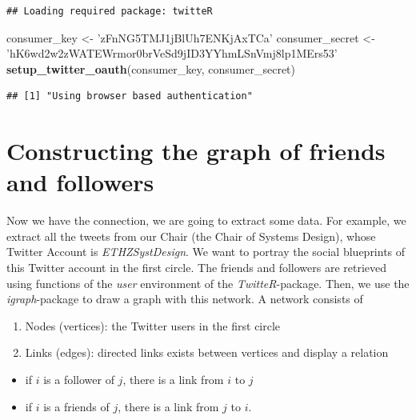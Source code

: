 \documentclass[]{article}
\newenvironment{Shaded}{\begin{snugshade}}{\end{snugshade}}
\newcommand{\KeywordTok}[1]{\textcolor[rgb]{0.13,0.29,0.53}{\textbf{{#1}}}}
\newcommand{\StringTok}[1]{\textcolor[rgb]{0.31,0.60,0.02}{{#1}}}
\newcommand{\NormalTok}[1]{{#1}}
\begin{document}
\begin{verbatim}
## Loading required package: twitteR
\end{verbatim}

\begin{Shaded}
\begin{Highlighting}[]
\NormalTok{consumer_key <-}\StringTok{ 'zFnNG5TMJ1jBlUh7ENKjAxTCa'}
\NormalTok{consumer_secret <-}\StringTok{ 'hK6wd2w2zWATEWrmor0brVeSd9jID3YYhmLSnVmj8lp1MErs53'}
\KeywordTok{setup_twitter_oauth}\NormalTok{(consumer_key, consumer_secret)}
\end{Highlighting}
\end{Shaded}

\begin{verbatim}
## [1] "Using browser based authentication"
\end{verbatim}

\section{Constructing the graph of friends and
followers}\label{constructing-the-graph-of-friends-and-followers}

Now we have the connection, we are going to extract some data. For
example, we extract all the tweets from our Chair (the Chair of Systems
Design), whose Twitter Account is \emph{ETHZSystDesign}. We want to
portray the social blueprints of this Twitter account in the first
circle. The friends and followers are retrieved using functions of the
\emph{user} environment of the \emph{TwitteR}-package. Then, we use the
\emph{igraph}-package to draw a graph with this network. A network
consists of

\begin{enumerate}
\def\labelenumi{\arabic{enumi}.}
\itemsep1pt\parskip0pt
\item
  Nodes (vertices): the Twitter users in the first circle
\item
  Links (edges): directed links exists between vertices and display a
  relation
\end{enumerate}

\begin{itemize}
\itemsep1pt\parskip0pt
\item
  if $i$ is a follower of $j$, there is a link from $i$ to $j$
\item
  if $i$ is a friends of $j$, there is a link from $j$ to $i$.
\end{itemize}
\end{document}
